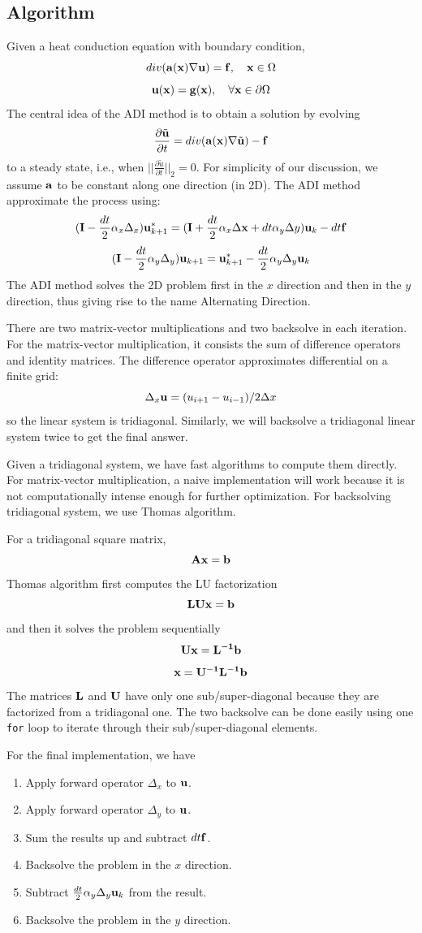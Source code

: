 \documentclass[a4paper,11pt]{article}
\begin{document}
\begin{multicols}{2}
	\subsection{Algorithm}
	Given a heat conduction equation with boundary condition,
	\[div({\bf a}({\bf x})\nabla{\bf u}) = {\bf f},\quad {\bf x}\in\Omega\]
	\[{\bf u}({\bf x}) = {\bf g}({\bf x}),\quad \forall {\bf x}\in\partial \Omega\]
	The central idea of the ADI method is to obtain a solution by evolving
	\[\frac{\partial \tilde{\bf u}}{\partial t} = div({\bf a}({\bf x})\nabla\tilde{\bf u}) - {\bf f}\]
	to a steady state, i.e., when $||\frac{\partial \tilde{u}}{\partial t}||_2 = 0$. For simplicity of our discussion, we assume $\bf a$ to be constant along one direction (in 2D). The ADI method approximate the process using:
	\[({\bf I} - \frac{dt}{2}\alpha_x\Delta_x){\bf u}_{k+1}^* = ({\bf I}+\frac{dt}{2}\alpha_x\Delta{\bf x}+dt\alpha_y\Delta y){\bf u}_k - dt {\bf f}\]
	\[({\bf I} - \frac{dt}{2}\alpha_y\Delta_y){\bf u}_{k+1} = {\bf u}_{k+1}^*-\frac{dt}{2}\alpha_y\Delta_y{\bf u}_k\]
The ADI method solves the 2D problem first in the $x$ direction and then in the $y$ direction, thus giving rise to the name Alternating Direction.
\par There are two matrix-vector multiplications and two backsolve in each iteration. For the matrix-vector multiplication, it consists the sum of difference operators and identity matrices. The difference operator approximates differential on a finite grid:
	\[\Delta_x {\bf u} = (u_{i+1}-u_{i-1})/2\Delta x\]
	so the linear system is tridiagonal. Similarly, we will backsolve a tridiagonal linear system twice to get the final answer.
\par Given a tridiagonal system, we have fast algorithms to compute them directly. For matrix-vector multiplication, a naive implementation will work because it is not computationally intense enough for further optimization. For backsolving tridiagonal system, we use Thomas algorithm.
\par For a tridiagonal square matrix,
\[\bf Ax = b\] 
Thomas algorithm first computes the LU factorization
\[\bf LUx = b\]
and then it solves the problem sequentially
\[\bf Ux = L^{-1}b\]
\[\bf x = U^{-1}L^{-1}b\]
The matrices $\bf L$ and $\bf U$ have only one sub/super-diagonal because they are factorized from a tridiagonal one. The two backsolve can be done easily using one \texttt{for} loop to iterate through their sub/super-diagonal elements.
\par For the final implementation, we have
\begin{enumerate}
\item Apply forward operator $\Delta_x$ to $\bf u$.
\item Apply forward operator $\Delta_y$ to $\bf u$.
\item Sum the results up and subtract $dt{\bf f}$.
\item Backsolve the problem in the $x$ direction.
\item Subtract $\frac{dt}{2}\alpha_y\Delta_y {\bf u}_k$ from the result.
\item Backsolve the problem in the $y$ direction.
\end{enumerate}

\end{multicols}
\end{document}
